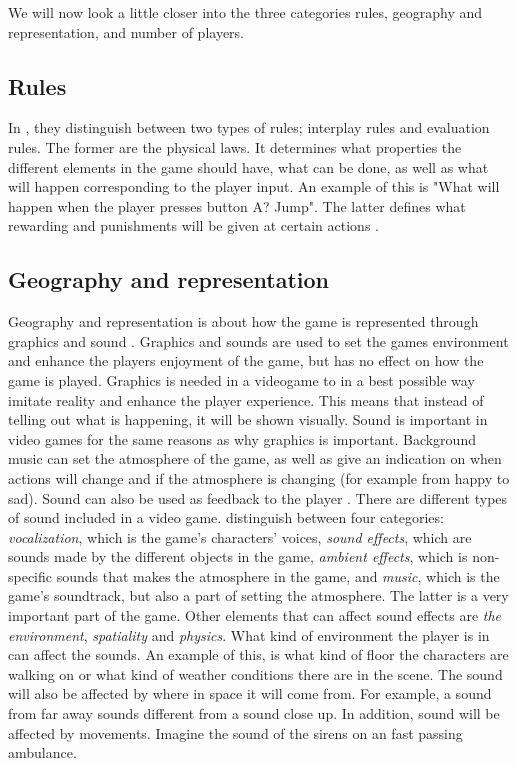 We will now look a little closer into the three categories rules, geography and representation, and number of players.

\subsection{Rules}
In \cite{understandingvg}, they distinguish between two types of rules; interplay rules and evaluation rules. The former are the physical laws. It determines what properties the different elements in the game should have, what can be done, as well as what will happen corresponding to the player input. An example of this is "What will happen when the player presses button A? Jump". The latter defines what rewarding and punishments will be given at certain actions \cite{understandingvg}. 

\subsection{Geography and representation}
Geography and representation is about how the game is represented through graphics and sound \cite{understandingvg}. Graphics and sounds are used to set the games environment and enhance the players enjoyment of the game, but has no effect on how the game is played. Graphics is needed in a videogame to in a best possible way imitate reality and enhance the player experience. This means that instead of telling out what is happening, it will be shown visually. Sound is important in video games for the same reasons as why graphics is important. Background music can set the atmosphere of the game, as well as give an indication on when actions will change and if the atmosphere is changing (for example from happy to sad). Sound can also be used as feedback to the player \cite{umlapproach}. There are different types of sound included in a  video game. \cite{understandingvg} distinguish between four categories:
\emph{vocalization}, which is the game’s characters’ voices,
\emph{sound effects}, which are sounds made by the different objects in the game, \emph{ambient effects}, which is non-specific sounds that makes the atmosphere in the game, and \emph{music}, which is the game’s soundtrack, but also a part of setting the atmosphere. The latter is a very important part of the game. Other elements that can affect sound effects are \emph{the environment}, \emph{spatiality} and \emph{physics}. What kind of environment the player is in can affect the  sounds. An example of this, is what kind of floor the characters are walking on or what kind of weather conditions there are in the scene. The sound will also be affected by where in space it will come from. For example, a sound from far away sounds different from a sound close up. In addition, sound will be affected by movements. Imagine the sound of the sirens on an fast passing ambulance.

